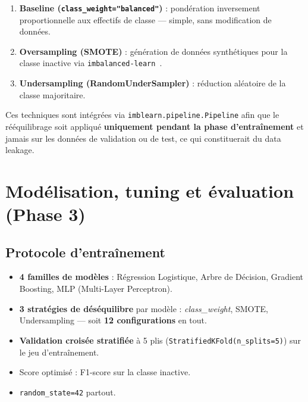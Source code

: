 \documentclass[12pt,a4paper]{article}
\begin{document}
\begin{enumerate}
  \item \textbf{Baseline (\texttt{class\_weight="balanced"})} : pondération inversement
    proportionnelle aux effectifs de classe --- simple, sans modification de données.
  \item \textbf{Oversampling (SMOTE)} : génération de données synthétiques pour la classe
    inactive via \texttt{imbalanced-learn}~\cite{chawla2002}.
  \item \textbf{Undersampling (RandomUnderSampler)} : réduction aléatoire de la classe
    majoritaire.
\end{enumerate}

\begin{warnbox}
Ces techniques sont intégrées via \texttt{imblearn.pipeline.Pipeline} afin que le
rééquilibrage soit appliqué \textbf{uniquement pendant la phase d'entraînement} et jamais
sur les données de validation ou de test, ce qui constituerait du data leakage.
\end{warnbox}

\newpage
\section{Modélisation, tuning et évaluation (Phase 3)}

\subsection{Protocole d'entraînement}

\begin{itemize}[noitemsep]
  \item \textbf{4 familles de modèles} : Régression Logistique, Arbre de Décision,
    Gradient Boosting, MLP (Multi-Layer Perceptron).
  \item \textbf{3 stratégies de déséquilibre} par modèle : \textit{class\_weight}, SMOTE,
    Undersampling --- soit \textbf{12 configurations} en tout.
  \item \textbf{Validation croisée stratifiée} à 5 plis (\texttt{StratifiedKFold(n\_splits=5)})
    sur le jeu d'entraînement.
  \item Score optimisé : F1-score sur la classe inactive.
  \item \texttt{random\_state=42} partout.
\end{itemize}
\end{document}

